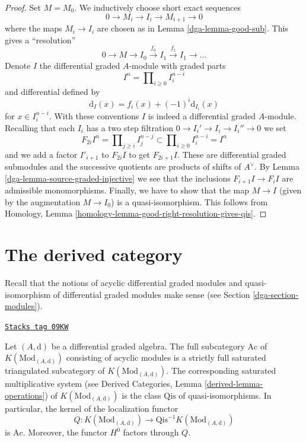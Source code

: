 \begin{proof}

Set $M = M_0$. We inductively choose short exact sequences
$$
0 \to M_i \to I_i \to M_{i + 1} \to 0
$$
where the maps $M_i \to I_i$ are chosen as in Lemma \ref{dga-lemma-good-sub}.
This gives a ``resolution''
$$
0 \to M \to I_0 \xrightarrow{f_0} I_1 \xrightarrow{f_1} I_1 \to \ldots
$$
Denote $I$ the differential graded $A$-module with graded parts
$$
I^n = \prod\nolimits_{i \geq 0} I^{n - i}_i
$$
and differential defined by
$$
\text{d}_I(x) = f_i(x) + (-1)^i \text{d}_{I_i}(x)
$$
for $x \in I_i^{n - i}$. With these conventions $I$ is indeed a differential
graded $A$-module. Recalling that each $I_i$ has a two step filtration
$0 \to I_i' \to I_i \to I_i'' \to 0$ we set
$$
F_{2i}I^n = \prod\nolimits_{j \geq i} I^{n - j}_j
\subset
\prod\nolimits_{i \geq 0} I^{n - i}_i = I^n
$$
and we add a factor $I'_{i + 1}$ to $F_{2i}I$ to get $F_{2i + 1}I$.
These are differential graded submodules and the successive quotients
are products of shifts of $A^\vee$. By
Lemma \ref{dga-lemma-source-graded-injective} we see that
the inclusions $F_{i + 1}I \to F_iI$ are admissible monomorphisms.
Finally, we have to show that the map $M \to I$ (given by the
augmentation $M \to I_0$) is a quasi-isomorphism. This follows from
Homology, Lemma \ref{homology-lemma-good-right-resolution-gives-qis}.
\end{proof}

\section{The derived category}
\label{dga-section-derived}
Recall that the notions of acyclic differential graded modules
and quasi-isomorphism of differential graded modules make sense
(see Section \ref{dga-section-modules}).

\begin{lemma}[Acyclic]
\label{dga-lemma-acyclic}
\href{https://stacks.math.columbia.edu/tag/09KW}{\texttt{Stacks tag 09KW}}

Let $(A, \text{d})$ be a differential graded algebra.
The full subcategory $\text{Ac}$ of $K(\text{Mod}_{(A, \text{d})})$
consisting of acyclic modules is a strictly full saturated triangulated
subcategory of $K(\text{Mod}_{(A, \text{d})})$.
The corresponding saturated multiplicative system
(see Derived Categories, Lemma \ref{derived-lemma-operations})
of $K(\text{Mod}_{(A, \text{d})})$ is the class $\text{Qis}$
of quasi-isomorphisms. In particular, the kernel of the localization
functor
$$
Q : K(\text{Mod}_{(A, \text{d})}) \to
\text{Qis}^{-1}K(\text{Mod}_{(A, \text{d})})
$$
is $\text{Ac}$. Moreover, the functor $H^0$ factors through $Q$.
\end{lemma}


